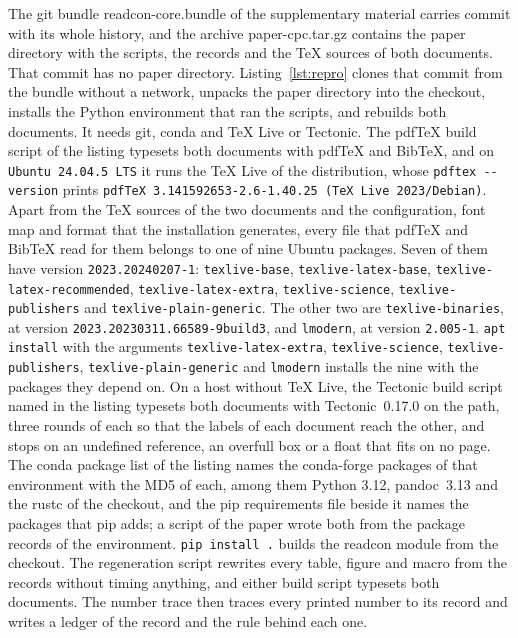 \documentclass[preprint,12pt]{elsarticle}
\begin{document}
The git bundle readcon-core.bundle of the supplementary material carries commit \texttt{\readconcommitshort} with its whole history, and the archive paper-cpc.tar.gz contains the paper directory with the scripts, the records and the TeX sources of both documents.
That commit has no paper directory.
Listing~\ref{lst:repro} clones that commit from the bundle without a network, unpacks the paper directory into the checkout, installs the Python environment that ran the scripts, and rebuilds both documents.
It needs git, conda and TeX Live or Tectonic.
The pdfTeX build script of the listing typesets both documents with pdfTeX and BibTeX, and on \texttt{Ubuntu 24.04.5 LTS} it runs the TeX Live of the distribution, whose \texttt{pdftex -{}-version} prints \texttt{pdfTeX 3.141592653-2.6-1.40.25 (TeX Live 2023/Debian)}.
Apart from the TeX sources of the two documents and the configuration, font map and format that the installation generates, every file that pdfTeX and BibTeX read for them belongs to one of nine Ubuntu packages.
Seven of them have version \texttt{2023.20240207-1}: \texttt{texlive-\allowbreak base}, \texttt{texlive-\allowbreak latex-\allowbreak base}, \texttt{texlive-\allowbreak latex-\allowbreak recommended}, \texttt{texlive-\allowbreak latex-\allowbreak extra}, \texttt{texlive-\allowbreak science}, \texttt{texlive-\allowbreak publishers} and \texttt{texlive-\allowbreak plain-\allowbreak generic}.
The other two are \texttt{texlive-\allowbreak binaries}, at version \texttt{2023.20230311.66589-9build3}, and \texttt{lmodern}, at version \texttt{2.005-1}.
\texttt{apt install} with the arguments \texttt{texlive-\allowbreak latex-\allowbreak extra}, \texttt{texlive-\allowbreak science}, \texttt{texlive-\allowbreak publishers}, \texttt{texlive-\allowbreak plain-\allowbreak generic} and \texttt{lmodern} installs the nine with the packages they depend on.
On a host without TeX Live, the Tectonic build script named in the listing typesets both documents with Tectonic~0.17.0 on the path, three rounds of each so that the labels of each document reach the other, and stops on an undefined reference, an overfull box or a float that fits on no page.
The conda package list of the listing names the conda-forge packages of that environment with the MD5 of each, among them Python 3.12, pandoc~3.13 and the rustc of the checkout, and the pip requirements file beside it names the packages that pip adds; a script of the paper wrote both from the package records of the environment.
\texttt{pip install .} builds the readcon module from the checkout.
The regeneration script rewrites every table, figure and macro from the records without timing anything, and either build script typesets both documents.
The number trace then traces every printed number to its record and writes a ledger of the record and the rule behind each one.
\end{document}
